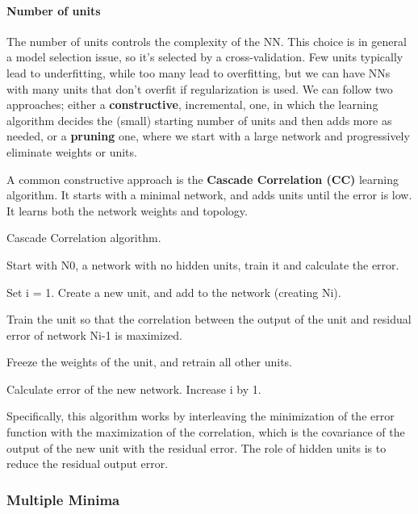 \paragraph{Number of units}

The number of units controls the complexity of the NN. This choice is in general a model selection issue, so it's selected by a cross-validation. Few units typically lead to underfitting, while too many lead to overfitting, but we can have NNs with many units that don't overfit if regularization is used. We can follow two approaches; either a \textbf{constructive}, incremental, one, in which the learning algorithm decides the (small) starting number of units and then adds more as needed, or a \textbf{pruning} one, where we start with a large network and progressively eliminate weights or units.

A common constructive approach is the \textbf{Cascade Correlation (CC)} learning algorithm. It starts with a minimal network, and adds units until the error is low. It learns both the network weights and topology.

\begin{algorithm}
\caption{Cascade Correlation algorithm.}
\begin{algorithmic}[1]
    \State Start with N0, a network with no hidden units, train it and calculate the error.

        \State Set i = 1.
        \Repeat 
            \State Create a new unit, and add to the network (creating Ni).
            
            \State Train the unit so that the correlation between the output of the unit and residual error of network Ni-1 is maximized.

            \State Freeze the weights of the unit, and retrain all other units.
            
            \State Calculate error of the new network.
            \State Increase i by 1.
    \EndIf
\end{algorithmic}
\end{algorithm}
Specifically, this algorithm works by interleaving the minimization of the error function with the maximization of the correlation, which is the covariance of the output of the new unit with the residual error. The role of hidden units is to reduce the residual output error.

\subsubsection{Multiple Minima}

